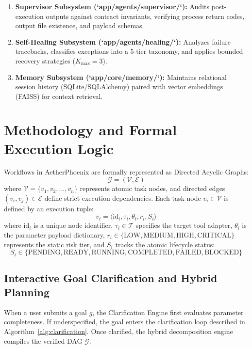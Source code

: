 \documentclass[conference]{IEEEtran}
\begin{document}
\begin{enumerate}
    \item \textbf{Supervisor Subsystem (`app/agents/supervisor/`):} Audits post-execution outputs against contract invariants, verifying process return codes, output file existence, and payload schemas.

    \item \textbf{Self-Healing Subsystem (`app/agents/healing/`):} Analyzes failure tracebacks, classifies exceptions into a 5-tier taxonomy, and applies bounded recovery strategies ($K_{\text{max}}=3$).

    \item \textbf{Memory Subsystem (`app/core/memory/`):} Maintains relational session history (SQLite/SQLAlchemy) paired with vector embeddings (FAISS) for context retrieval.
\end{enumerate}

\section{Methodology and Formal Execution Logic}
\label{sec:methodology}

Workflows in AetherPhoenix are formally represented as Directed Acyclic Graphs:
\begin{equation}
\mathcal{G} = (\mathcal{V}, \mathcal{E})
\end{equation}
where $\mathcal{V} = \{v_1, v_2, \dots, v_n\}$ represents atomic task nodes, and directed edges $(v_i, v_j) \in \mathcal{E}$ define strict execution dependencies. Each task node $v_i \in \mathcal{V}$ is defined by an execution tuple:
\begin{equation}
v_i = \langle \text{id}_i, \tau_i, \theta_i, r_i, S_i \rangle
\end{equation}
where $\text{id}_i$ is a unique node identifier, $\tau_i \in \mathcal{T}$ specifies the target tool adapter, $\theta_i$ is the parameter payload dictionary, $r_i \in \{\text{LOW}, \text{MEDIUM}, \text{HIGH}, \text{CRITICAL}\}$ represents the static risk tier, and $S_i$ tracks the atomic lifecycle status:
\begin{equation}
S_i \in \{\text{PENDING}, \text{READY}, \text{RUNNING}, \text{COMPLETED}, \text{FAILED}, \text{BLOCKED}\}
\end{equation}

\subsection{Interactive Goal Clarification and Hybrid Planning}
When a user submits a goal $g$, the Clarification Engine first evaluates parameter completeness. If underspecified, the goal enters the clarification loop described in Algorithm~\ref{alg:clarification}. Once clarified, the hybrid decomposition engine compiles the verified DAG $\mathcal{G}$.
\end{document}
